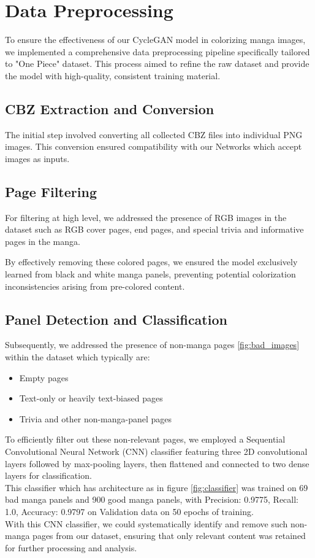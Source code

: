  

\section{Data Preprocessing}

To ensure the effectiveness of our CycleGAN model in colorizing manga images, we implemented a comprehensive data preprocessing pipeline specifically tailored to "One Piece" dataset. This process aimed to refine the raw dataset and provide the model with high-quality, consistent training material.

\subsection{CBZ Extraction and Conversion}

The initial step involved converting all collected CBZ files into individual PNG images. This conversion ensured compatibility with our Networks which accept images as inputs.

\subsection{Page Filtering}

For filtering at high level, we addressed the presence of RGB images in the dataset such as RGB cover pages, end pages, and special trivia and informative pages in the manga.

By effectively removing these colored pages, we ensured the model exclusively learned from black and white manga panels, preventing potential colorization inconsistencies arising from pre-colored content.

\subsection{Panel Detection and Classification}

Subsequently, we addressed the presence of non-manga pages \ref{fig:bad_images} within the dataset which typically are:
\begin{itemize}
    \item Empty pages
    \item Text-only or heavily text-biased pages
    \item Trivia and other non-manga-panel pages
\end{itemize}

To efficiently filter out these non-relevant pages, we employed a Sequential  Convolutional Neural Network (CNN) classifier featuring three 2D convolutional layers followed by max-pooling layers, then flattened and connected to two dense layers for classification. \\This classifier which has architecture as in figure \ref{fig:classifier} was trained on 69 bad manga panels and 900 good manga panels, with Precision: 0.9775, Recall: 1.0, Accuracy: 0.9797 on Validation data on 50 epochs of training.\\
With this CNN classifier, we could systematically identify and remove such non-manga pages from our dataset, ensuring that only relevant content was retained for further processing and analysis.

